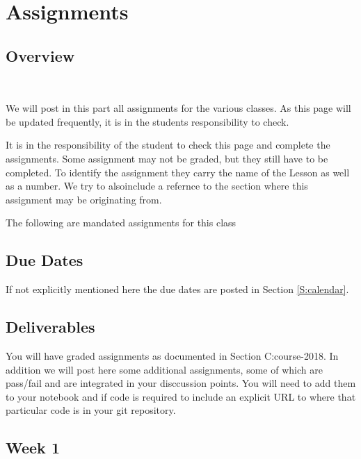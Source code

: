 \chapter{Assignments}

\section{Overview}
\FILENAME\

We will post in this part all assignments for the various classes. As
this page will be updated frequently, it is in the students
responsibility to check.

It is in the
responsibility of the student to check this page and complete the
assignments. Some assignment may not be graded, but they still have to
be completed. To identify the assignment they carry the name of the
Lesson as well as a number. We try to alsoinclude a refernce to the
section where this assignment may be originating from.

The following are mandated assignments for this class

\section{Due Dates}

If not explicitly mentioned here the due dates are posted in Section
\ref{S:calendar}.

\section{Deliverables}

You will have graded assignments as documented in Section
{C:course-2018}. In addition we will post here some additional
assignments, some of which are pass/fail and are integrated in your
disccussion points. You will need to add them to your notebook and if
code is required to include an explicit URL to where that particular
code is in your git repository.

\section{Week 1}

